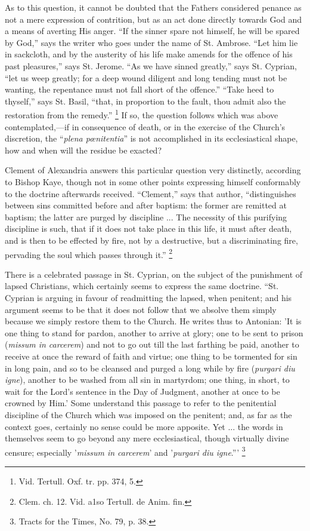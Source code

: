 As to this question, it cannot be doubted that the Fathers
considered penance as not a mere expression of contrition, but as an
act done directly towards God and a means of averting His anger.
``If the sinner spare not himself, he will be spared by God,''
says the writer who goes under the name of St. Ambrose. ``Let him
lie in sackcloth, and by the austerity of his life make amends for the
offence of his past pleasures,'' says St. Jerome. ``As we have
sinned greatly,'' says St. Cyprian, ``let us weep greatly; for
a deep wound diligent and long tending must not be wanting, the
repentance must not fall short of the offence.'' ``Take heed
to thyself,'' says St. Basil, ``that, in proportion to the
fault, thou admit also the restoration from the remedy.'' \footnote{Vid. Tertull. Oxf. tr. pp. 374, 5.} If so, the question follows which was above contemplated,—if in
consequence of death, or in the exercise of the Church's discretion,
the ``\emph{plena pœnitentia}'' is not accomplished in its
ecclesiastical shape, how and when will the residue be exacted?


Clement of Alexandria answers this particular question very
distinctly, according to Bishop Kaye, though not in some other points
expressing himself conformably to the doctrine afterwards received.
``Clement,'' says that author, ``distinguishes between
sins committed before and after baptism: the former are remitted at
baptism; the latter are purged by discipline ... The necessity of this
purifying discipline is such, that if it does not take place in this
life, it must after death, and is then to be effected by fire, not by
a destructive, but a discriminating fire, pervading the soul which
passes through it.'' \footnote{Clem. ch. 12. Vid. a1so Tertull. de Anim.
fin.}

There is a celebrated passage in St. Cyprian, on the subject of the
punishment of lapsed Christians, which certainly seems to express the
same doctrine. ``St. Cyprian is arguing in favour of readmitting
the lapsed, when penitent; and his argument seems to be that it does
not follow that we absolve them simply because we simply restore them
to the Church. He writes thus to Antonian: 'It is one thing to stand
for pardon, another to arrive at glory; one to be sent to prison (\emph{missum
in carcerem}) and not to go out till the last farthing be paid,
another to receive at once the reward of faith and virtue; one thing
to be tormented for sin in long pain, and so to be cleansed and purged
a long while by fire (\emph{purgari diu igne}), another to be washed
from all sin in martyrdom; one thing, in short, to wait for the Lord's
sentence in the Day of Judgment, another at once to be crowned by
Him.' Some understand this passage to refer to the penitential
discipline of the Church which was imposed on the penitent; and, as
far as the context goes, certainly no sense could be more apposite.
Yet ... the words in themselves seem to go beyond any mere
ecclesiastical, though virtually divine censure; especially '\emph{missum
in carcerem}' and '\emph{purgari diu igne}.''' \footnote{Tracts for the Times, No. 79, p. 38.}

